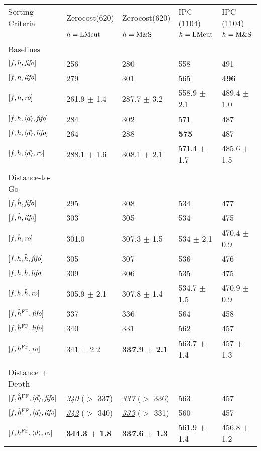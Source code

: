 \begin{center}
\begin{tabular}{|l|ll|ll|}
Sorting Criteria & Zerocost(620) & Zerocost(620) & IPC (1104) & IPC (1104)\\
 & \(h=\text{LMcut}\) & \(h=\text{M\&S}\) & \(h=\text{LMcut}\) & \(h=\text{M\&S}\)\\
 &  &  &  & \\
Baselines &  &  &  & \\
\([f,h,{\text{\textit{fifo}}}]\) & 256 & 280 & 558 & 491\\
\([f,h,{\text{\textit{lifo}}}]\) & 279 & 301 & 565 & \textbf{496}\\
\([f,h,{\text{\textit{ro}}}]\) & 261.9 \(\pm\) 1.4 & 287.7 \(\pm\) 3.2 & 558.9 \(\pm\) 2.1 & 489.4 \(\pm\) 1.0\\
\([f,h,{\left<d\right>},{\text{\textit{fifo}}}]\) & 284 & 302 & 571 & 487\\
\([f,h,{\left<d\right>},{\text{\textit{lifo}}}]\) & 264 & 288 & \textbf{575} & 487\\
\([f,h,{\left<d\right>},{\text{\textit{ro}}}]\) & 288.1 \(\pm\) 1.6 & 308.1 \(\pm\) 2.1 & 571.4 \(\pm\) 1.7 & 485.6 \(\pm\) 1.5\\
 &  &  &  & \\
Distance-to-Go &  &  &  & \\
\([f,\hat{h},{\text{\textit{fifo}}}]\) & 295 & 308 & 534 & 477\\
\([f,\hat{h},{\text{\textit{lifo}}}]\) & 303 & 305 & 534 & 475\\
\([f,\hat{h},{\text{\textit{ro}}}]\) & 301.0 & 307.3 \(\pm\) 1.5 & 534 \(\pm\) 2.1 & 470.4 \(\pm\) 0.9\\
\([f,h,\hat{h},{\text{\textit{fifo}}}]\) & 305 & 307 & 536 & 476\\
\([f,h,\hat{h},{\text{\textit{lifo}}}]\) & 309 & 306 & 535 & 475\\
\([f,h,\hat{h},{\text{\textit{ro}}}]\) & 305.9 \(\pm\) 2.1 & 307.8 \(\pm\) 1.4 & 534.7 \(\pm\) 1.5 & 470.9 \(\pm\) 0.9\\
\([f,\hat{h}^{\text{FF}},{\text{\textit{fifo}}}]\) & 337 & 336 & 564 & 458\\
\([f,\hat{h}^{\text{FF}},{\text{\textit{lifo}}}]\) & 340 & 331 & 562 & 457\\
\([f,\hat{h}^{\text{FF}},{\text{\textit{ro}}}]\) & 341 \(\pm\) 2.2 & \textbf{337.9 \(\pm\) 2.1} & 563.7 \(\pm\) 1.4 & 457 \(\pm\) 1.3\\
 &  &  &  & \\
Distance + Depth &  &  &  & \\
\([f,\hat{h}^{\text{FF}},{\left<d\right>},{\text{\textit{fifo}}}]\) & \uline{\emph{340}} (\(>\) 337) & \uline{\emph{337}} (\(>\) 336) & 563 & 457\\
\([f,\hat{h}^{\text{FF}},{\left<d\right>},{\text{\textit{lifo}}}]\) & \uline{\emph{342}} (\(>\) 340) & \uline{\emph{333}} (\(>\) 331) & 560 & 457\\
\([f,\hat{h}^{\text{FF}},{\left<d\right>},{\text{\textit{ro}}}]\) & \textbf{344.3 \(\pm\) 1.8} & \textbf{337.6 \(\pm\) 1.3} & 561.9 \(\pm\) 1.4 & 456.8 \(\pm\) 1.2\\
\end{tabular}
\end{center}
